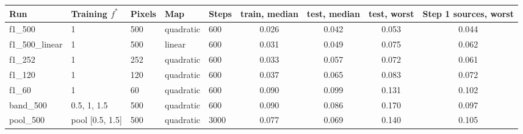 \begin{tabular}{lllllcccc}
\toprule
Run & Training $f^*$ & Pixels & Map & Steps & train, median & test, median & test, worst & Step 1 sources, worst \\
\midrule
f1\_500 & 1 & 500 & quadratic & 600 & 0.026 & 0.042 & 0.053 & 0.044 \\
f1\_500\_linear & 1 & 500 & linear & 600 & 0.031 & 0.049 & 0.075 & 0.062 \\
f1\_252 & 1 & 252 & quadratic & 600 & 0.033 & 0.057 & 0.072 & 0.061 \\
f1\_120 & 1 & 120 & quadratic & 600 & 0.037 & 0.065 & 0.083 & 0.072 \\
f1\_60 & 1 & 60 & quadratic & 600 & 0.090 & 0.099 & 0.131 & 0.102 \\
band\_500 & 0.5, 1, 1.5 & 500 & quadratic & 600 & 0.090 & 0.086 & 0.170 & 0.097 \\
pool\_500 & pool [0.5, 1.5] & 500 & quadratic & 3000 & 0.077 & 0.069 & 0.140 & 0.105 \\
\bottomrule
\end{tabular}
